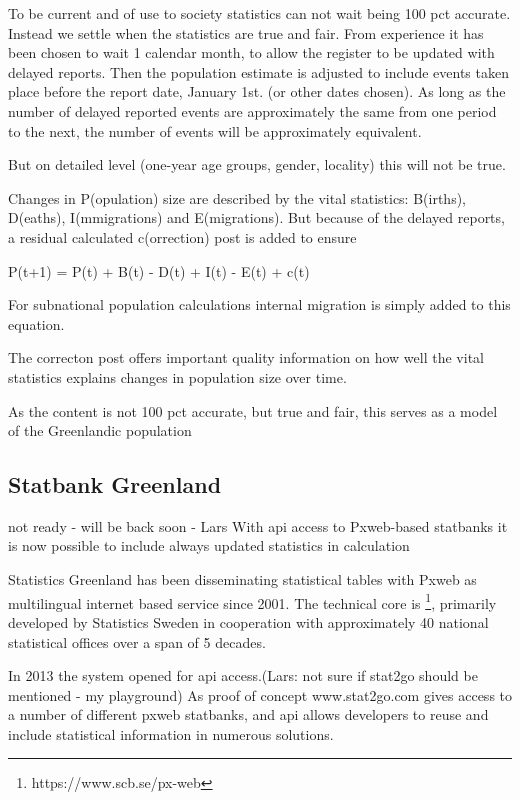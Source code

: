 \documentclass[USenglish]{article}
\begin{document}
To be current and of use to society statistics can not wait being 100 pct accurate. Instead we settle when the statistics are true and fair. From experience it has been chosen to wait 1 calendar month, to allow the register to be updated with delayed reports. Then the population estimate is adjusted to include events taken place before the report date, January 1st. (or other dates chosen). As long as the number of delayed reported events are approximately the same from one period to the next, the number of events will be approximately equivalent.

But on detailed level (one-year age groups, gender, locality) this will not be true.

Changes in P(opulation) size are described by the vital statistics: B(irths), D(eaths), I(mmigrations) and E(migrations). But because of the delayed reports, a residual calculated c(orrection) post is added to ensure


P(t+1) = P(t) + B(t) - D(t) + I(t) - E(t) + c(t)


For subnational population calculations internal migration is simply added to this equation.

The correcton post offers important quality information on how well the vital statistics explains changes in population size over time.

As the content is not 100 pct accurate, but true and fair, this serves as a model of the Greenlandic population


\subsection{Statbank Greenland} 
not ready - will be back soon - Lars
With api access to Pxweb-based statbanks it is now possible to include always updated statistics in calculation 

Statistics Greenland has been disseminating statistical tables with Pxweb as multilingual internet based service since 2001. The technical core is \footnote[the Pxweb-family]{https://www.scb.se/px-web}, primarily developed by Statistics Sweden in cooperation with approximately 40 national statistical offices over a span of 5 decades. 

In 2013 the system opened for api access.(Lars: not sure if stat2go should be mentioned - my playground) As proof of concept www.stat2go.com gives access to a number of different pxweb statbanks, and api allows developers to reuse and include statistical information in numerous solutions.
\end{document}
